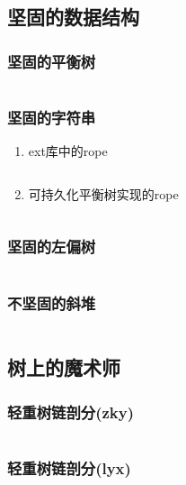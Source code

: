 \documentclass[a4paper]{article}
\newcommand{\cppcode}[1]{
    \inputminted[mathescape,
    frame=lines,linenos]{cpp}{source/#1}
}
\begin{document}
\subsection{坚固的数据结构}



\subsubsection{坚固的平衡树}

\cppcode{data-structure/fhqTreap.cpp}

\subsubsection{坚固的字符串}

\begin{enumerate}
	\item ext库中的rope
	\cppcode{data-structure/crope.cpp}
	\item 可持久化平衡树实现的rope
	\cppcode{data-structure/rope.cpp}
\end{enumerate}

\subsubsection{坚固的左偏树}
\cppcode{data-structure/lefttree.cpp}

\subsubsection{不坚固的斜堆}
\cppcode{data-structure/SkewHeap.cpp}

\subsection{树上的魔术师}

\subsubsection{轻重树链剖分(zky)}
\cppcode{data-structure/HLD.cpp}

\subsubsection{轻重树链剖分(lyx)}
\cppcode{data-structure/tree-chain.cpp}
\end{document}
